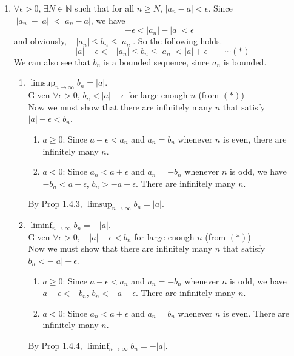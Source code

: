\documentclass[12pt]{report}
\newcommand{\numl}[1]{\item[\large\textbf{\sffamily #1.}]}
\newcommand{\bb}[1]{\mathbb{#1}}
\newcommand{\abs}[1]{\left|#1\right|}
\newcommand{\ds}{\displaystyle}
\begin{document}
\begin{enumerate}
\numl{5} $\forall\epsilon > 0$, $\exists N\in\bb{N}$ such that for all $n\geq N$, $\abs{a_n-a} < \epsilon$. Since $\abs{\abs{a_n} - \abs{a}} < \abs{a_n-a}$, we have $$-\epsilon < \abs{a_n}-\abs{a} < \epsilon$$and obviously, $-\abs{a_n}\leq b_n\leq \abs{a_n}$. So the following holds.
$$-\abs{a}-\epsilon < -\abs{a_n} \leq b_n\leq \abs{a_n}<\abs{a}+\epsilon \qquad \cdots (*)$$ We can also see that $b_n$ is a bounded sequence, since $a_n$ is bounded.
\begin{enumerate}
	\item $\ds\limsup_{n\rightarrow \infty} b_n = \abs{a}$.\\Given $\forall \epsilon>0$, $b_n<\abs{a}+\epsilon$ for large enough $n$ (from $(*)$)\\Now we must show that there are infinitely many $n$ that satisfy $\abs{a}-\epsilon < b_n$.
	\begin{enumerate}
		\item $a\geq 0$: Since $a-\epsilon < a_n$ and $a_n=b_n$ whenever $n$ is even, there are infinitely many $n$.
		\item $a < 0$: Since $a_n < a +\epsilon$ and $a_n = -b_n$ whenever $n$ is odd, we have $-b_n < a+\epsilon$, $b_n > -a-\epsilon$. There are infinitely many $n$.
	\end{enumerate}
	By \textsf{Prop 1.4.3}, $\ds \limsup_{n\rightarrow \infty} b_n = \abs{a}$.
	\item $\ds\liminf_{n\rightarrow \infty} b_n = -\abs{a}$.\\Given $\forall \epsilon>0$, $-\abs{a}-\epsilon <b_n$ for large enough $n$ (from $(*)$)\\Now we must show that there are infinitely many $n$ that satisfy $b_n < -\abs{a}+\epsilon $.
	\begin{enumerate}
		\item $a\geq 0$: Since $a-\epsilon < a_n$ and $a_n=-b_n$ whenever $n$ is odd, we have $a-\epsilon<-b_n$, $b_n < -a+\epsilon$. There are infinitely many $n$.
		\item $a < 0$: Since $a_n < a +\epsilon$ and $a_n = b_n$ whenever $n$ is even. There are infinitely many $n$.
	\end{enumerate}
	By \textsf{Prop 1.4.4}, $\ds \liminf_{n\rightarrow \infty} b_n = -\abs{a}$.
\end{enumerate}


\end{enumerate}
\end{document}
